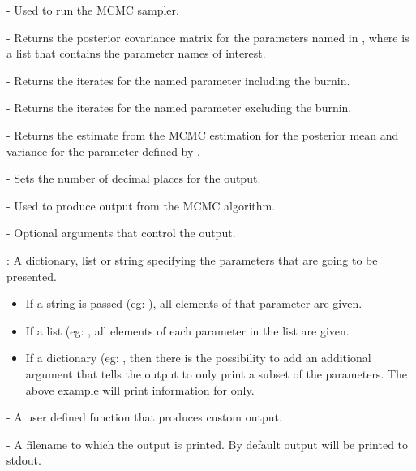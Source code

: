 \documentclass[article]{jss}
\begin{document}
\begin{description}
\item {} - Used to run the MCMC sampler. 
\item {} - Returns the posterior
  covariance matrix for the parameters named in , where
   is a list that contains the parameter names of
  interest.
\item {} - Returns the iterates for the named
  parameter including the burnin.
\item {} - Returns the iterates for
  the named parameter excluding the burnin.
\item {} - Returns the estimate from the MCMC
  estimation for the posterior mean and variance for the parameter
  defined by .
\item {} - Sets the number of decimal
  places for the output.
\item {} - Used to produce output from the
  MCMC algorithm.
  \begin{description}
  \item {} - Optional arguments that control the
    output.
    \begin{description}
    \item {}: A dictionary, list or string specifying
      the parameters that are going to be presented.
      \begin{itemize}
      \item If a string is passed (eg: ),
        all elements of that parameter are given.
      \item If a list (eg: , all elements of each parameter in the list are
        given.
      \item If a dictionary (eg: , then there is the
        possibility to add an additional argument  that
        tells the output to only print a subset of the parameters. The
        above example will print information for  only.
      \end{itemize}
    \item {} - A user defined function that produces custom
      output.
    \item {} - A filename to which the output is printed.
      By default output will be printed to stdout.
    \end{description}
   

\end{description}
\end{description}
\end{document}
